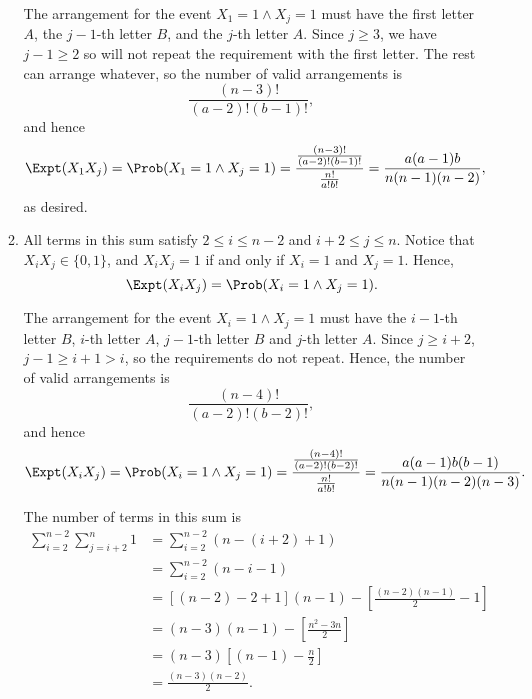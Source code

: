 \begin{enumerate}
\begin{enumerate}
                    The arrangement for the event \(X_1 = 1 \land X_j = 1\) must have the first letter \(A\), the \(j-1\)-th letter \(B\), and the \(j\)-th letter \(A\). Since \(j \geq 3\), we have \(j - 1 \geq 2\) so will not repeat the requirement with the first letter. The rest can arrange whatever, so the number of valid arrangements is
                    \[
                        \frac{(n - 3)!}{(a - 2)!(b - 1)!},
                    \]
                    and hence
                    \[
                        \Expt(X_1 X_j) = \Prob(X_1 = 1 \land X_j = 1) = \frac{\frac{(n - 3)!}{(a - 2)!(b - 1)!}}{\frac{n!}{a!b!}} = \frac{a (a - 1) b}{n (n - 1) (n - 2)},
                    \]
                    as desired.

              \item All terms in this sum satisfy \(2 \leq i \leq n - 2\) and \(i + 2 \leq j \leq n\).  Notice that \(X_i X_j \in \{0, 1\}\), and \(X_i X_j = 1\) if and only if \(X_i = 1\) and \(X_j = 1\). Hence,
                    \[
                        \Expt(X_i X_j) = \Prob(X_i = 1 \land X_j = 1).
                    \]

                    The arrangement for the event \(X_i = 1 \land X_j = 1\) must have the \(i - 1\)-th letter \(B\), \(i\)-th letter \(A\), \(j - 1\)-th letter \(B\) and \(j\)-th letter \(A\). Since \(j \geq i + 2\), \(j - 1 \geq i + 1 > i\), so the requirements do not repeat. Hence, the number of valid arrangements is
                    \[
                        \frac{(n - 4)!}{(a - 2)!(b - 2)!},
                    \]
                    and hence
                    \[
                        \Expt(X_i X_j) = \Prob(X_i = 1 \land X_j = 1) = \frac{\frac{(n - 4)!}{(a - 2)!(b - 2)!}}{\frac{n!}{a!b!}} = \frac{a (a - 1) b (b - 1)}{n (n - 1) (n - 2) (n - 3)}.
                    \]

                    The number of terms in this sum is
                    \begin{align*}
                        \sum_{i = 2}^{n - 2} \sum_{j = i + 2}^{n} 1 & = \sum_{i = 2}^{n - 2} (n - (i + 2) + 1)                                \\
                                                                    & = \sum_{i = 2}^{n - 2} (n - i - 1)                                      \\
                                                                    & = [(n - 2) - 2 + 1] (n - 1) - \left[\frac{(n - 2)(n - 1)}{2} - 1\right] \\
                                                                    & = (n - 3)(n - 1) - \left[\frac{n^2 - 3n}{2}\right]                      \\
                                                                    & = (n - 3) \left[(n - 1) - \frac{n}{2}\right]                            \\
                                                                    & = \frac{(n - 3)(n - 2)}{2}.
                    \end{align*}


\end{enumerate}
\end{enumerate}
